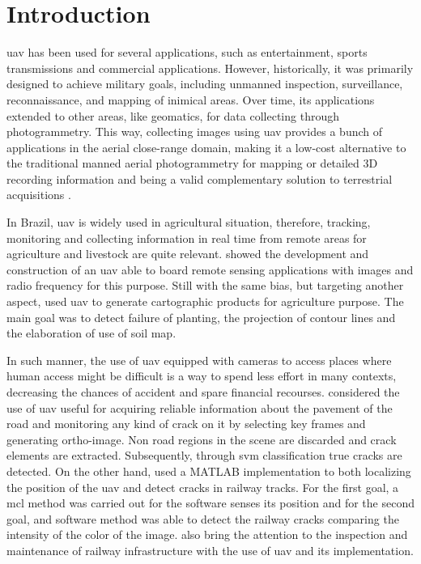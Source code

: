 \chapter[Introduction]{Introduction}\label{cha:intro}

\gls*{uav} has been used for several applications, such as entertainment, sports transmissions and commercial applications.
However, historically, it was primarily designed to achieve military goals, including unmanned inspection, surveillance, reconnaissance, and mapping of inimical areas.
Over time, its applications extended to other areas, like geomatics, for data collecting through photogrammetry. 
This way, collecting images using \gls*{uav} provides a bunch of applications in the aerial close-range domain, making it a low-cost alternative to the traditional manned aerial photogrammetry for mapping or detailed 3D recording information and being a valid complementary solution to terrestrial acquisitions \citep{nex2014uav}.

In Brazil, \gls*{uav} is widely used in agricultural situation, therefore, tracking, monitoring and collecting information in real time from remote areas for agriculture and livestock are quite relevant. 
\citet{abade2016construccao} showed the development and construction of an \gls*{uav} able to board remote sensing applications with images and radio frequency for this purpose. 
Still with the same bias, but targeting another aspect, \citet{otake2017produtos} used \gls*{uav} to generate cartographic products for agriculture purpose. 
The main goal was to detect failure of planting, the projection of contour lines and the elaboration of use of soil map.

In such manner, the use of \gls*{uav} equipped with cameras to access places where human access might be difficult is a way to spend less effort in many contexts, decreasing the chances of accident and spare financial recourses.
\citet{dadrasjavan2019automatic} considered the use of \gls*{uav} useful for acquiring reliable information about the pavement of the road and monitoring any kind of crack on it by selecting key frames and generating ortho-image.
Non road regions in the scene are discarded and crack elements are extracted.
Subsequently, through \gls*{svm} classification true cracks are detected. 
On the other hand, \citet{sushant2017localization} used a MATLAB\textsuperscript{\textregistered} implementation to both localizing the position of the \gls*{uav} and detect cracks in railway tracks. For the first goal, a \gls*{mcl} method was carried out for the software senses its position and for the second goal, and software method was able to detect the railway cracks comparing the intensity of the color of the image. \citet{lesiak2020inspection} also bring the attention to the inspection and
maintenance of railway infrastructure with the use of \gls*{uav} and its implementation.


